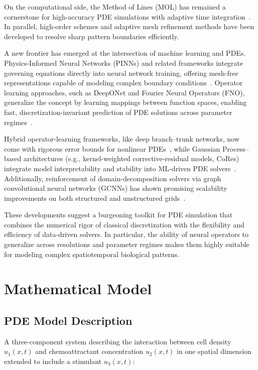 \documentclass[conference]{IEEEtran}
\begin{document}
On the computational side, the Method of Lines (MOL) has remained a cornerstone for high-accuracy PDE simulations with adaptive time integration~\cite{schiesser1991mol}. In parallel, high-order schemes and adaptive mesh refinement methods have been developed to resolve sharp pattern boundaries efficiently.

A new frontier has emerged at the intersection of machine learning and PDEs. Physics-Informed Neural Networks (PINNs) and related frameworks integrate governing equations directly into neural network training, offering mesh-free representations capable of modeling complex boundary conditions~\cite{raissi2019physics, raissi2017_pinn}. Operator learning approaches, such as DeepONet and Fourier Neural Operators (FNO), generalize the concept by learning mappings between function spaces, enabling fast, discretization-invariant prediction of PDE solutions across parameter regimes~\cite{yang2024_deeponet, li2020_fno}.

Hybrid operator-learning frameworks, like deep branch–trunk networks, now come with rigorous error bounds for nonlinear PDEs~\cite{academia12}, while Gaussian Process–based architectures (e.g., kernel-weighted corrective-residual models, CoRes) integrate model interpretability and stability into ML-driven PDE solvers~\cite{academia13}. Additionally, reinforcement of domain-decomposition solvers via graph convolutional neural networks (GCNNs) has shown promising scalability improvements on both structured and unstructured grids~\cite{search10}.

These developments suggest a burgeoning toolkit for PDE simulation that combines the numerical rigor of classical discretization with the flexibility and efficiency of data-driven solvers. In particular, the ability of neural operators to generalize across resolutions and parameter regimes makes them highly suitable for modeling complex spatiotemporal biological patterns.



\section{Mathematical Model}
\subsection{PDE Model Description}
A three-component system describing the interaction between cell density $u_1(x,t)$ and chemoattractant concentration $u_2(x,t)$ in one spatial dimension extended to include a stimulant $u_3(x,t)$:
\end{document}
